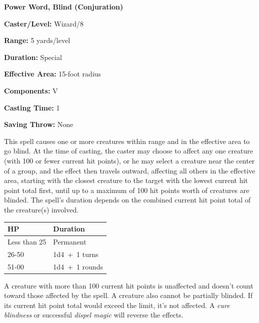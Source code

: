 \begin{multicols}{2}
\vspace{1em}

\noindent
\begin{minipage}{\columnwidth}

\noindent \textbf{Power Word, Blind (Conjuration)}

\noindent \textbf{Caster/Level:} Wizard/8

\noindent \textbf{Range:} 5 yards/level

\noindent \textbf{Duration:} Special

\noindent \textbf{Effective Area:} 15-foot radius

\noindent \textbf{Components:} V

\noindent \textbf{Casting Time:} 1

\noindent \textbf{Saving Throw:} None

\end{minipage}

This spell causes one or more creatures within range and in the effective area to go blind.  At the time of casting, the caster may choose to affect any one creature (with 100 or fewer current hit points), or he may select a creature near the center of a group, and the effect then travels outward, affecting all others in the effective area, starting with the closest creature to the target with the lowest current hit point total first, until up to a maximum of 100 hit points worth of creatures are blinded.  The spell's duration depends on the combined current hit point total of the creature(s) involved.
 
\noindent
\begin{tabular}{|p{}|p{}|}
\hline
HP	& Duration \\
\hline\hline
\rowcolor[gray]{.9}Less than 25	& Permanent \\
26-50	& 1d4~+~1 turns \\
\rowcolor[gray]{.9}51-00	& 1d4~+~1 rounds \\
\hline
\end{tabular}

A creature with more than 100 current hit points is unaffected and doesn't count toward those affected by the spell.  A creature also cannot be partially blinded.  If its current hit point total would exceed the limit, it's not affected.  A \textit{cure blindness} or successful \textit{dispel magic} will reverse the effects.

\vspace{1em}


\end{multicols}
